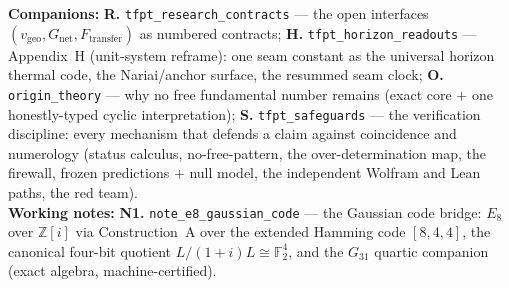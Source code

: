 \begin{navbox}
\noindent\textbf{Companions:} \textbf{R.} \texttt{tfpt\_research\_contracts} --- the open interfaces
$(v_{\mathrm{geo}}, G_{\mathrm{net}}, F_{\mathrm{transfer}})$ as numbered contracts;
\textbf{H.} \texttt{tfpt\_horizon\_readouts} --- Appendix~H (unit-system reframe): one seam constant as
the universal horizon thermal code, the Nariai/anchor surface, the resummed seam clock;
\textbf{O.} \texttt{origin\_theory} --- why no free fundamental number remains (exact core $+$ one
honestly-typed cyclic interpretation);
\textbf{S.} \texttt{tfpt\_safeguards} --- the verification discipline: every mechanism that defends a claim
against coincidence and numerology (status calculus, no-free-pattern, the over-determination map, the
firewall, frozen predictions $+$ null model, the independent Wolfram and Lean paths, the red team).\\[2pt]
\noindent\textbf{Working notes:} \textbf{N1.} \texttt{note\_e8\_gaussian\_code} --- the Gaussian code
bridge: $E_8$ over $\mathbb Z[i]$ via Construction~A over the extended Hamming code $[8,4,4]$, the
canonical four-bit quotient $L/(1{+}i)L\cong\mathbb F_2^4$, and the $G_{31}$ quartic companion (exact
algebra, machine-certified).
\end{navbox}

